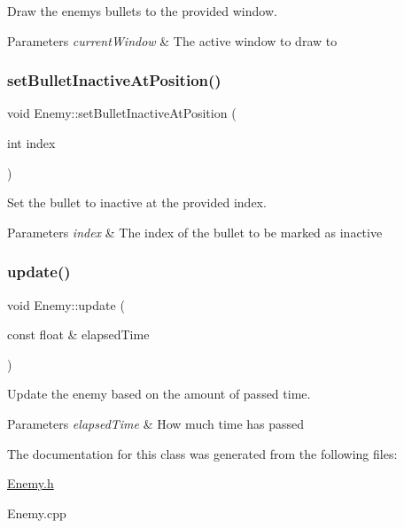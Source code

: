 Draw the enemy\textquotesingle{}s bullets to the provided window. 


\begin{DoxyParams}{Parameters}
{\em current\+Window} & The active window to draw to \\
\hline
\end{DoxyParams}
\mbox{\label{class_enemy_a02e1cacf8fad39bbcc28271a53637024}} 
\subsubsection{\texorpdfstring{set\+Bullet\+Inactive\+At\+Position()}{setBulletInactiveAtPosition()}}
{\footnotesize\ttfamily void Enemy\+::set\+Bullet\+Inactive\+At\+Position (\begin{DoxyParamCaption}\item[{int}]{index }\end{DoxyParamCaption})}



Set the bullet to inactive at the provided index. 


\begin{DoxyParams}{Parameters}
{\em index} & The index of the bullet to be marked as inactive \\
\hline
\end{DoxyParams}
\mbox{\label{class_enemy_a541b72a32e4a0217d58d1ee573c2f23a}} 
\subsubsection{\texorpdfstring{update()}{update()}}
{\footnotesize\ttfamily void Enemy\+::update (\begin{DoxyParamCaption}\item[{const float \&}]{elapsed\+Time }\end{DoxyParamCaption})}



Update the enemy based on the amount of passed time. 


\begin{DoxyParams}{Parameters}
{\em elapsed\+Time} & How much time has passed \\
\hline
\end{DoxyParams}


The documentation for this class was generated from the following files\+:\begin{DoxyCompactItemize}
\item 
\hyperlink{_enemy_8h}{Enemy.\+h}\item 
Enemy.\+cpp\end{DoxyCompactItemize}
